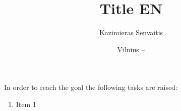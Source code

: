 \documentclass{VUMIFPSbakalaurinis}
\title{Title EN}
\author{Kazimieras Senvaitis}
\date{Vilnius – \the\year}
\begin{document}
\maketitle


\tableofcontents



In order to reach the goal the following tasks are raised:
\begin{enumerate}
	\item Item 1
\end{enumerate}









\printbibliography[heading=bibintoc]




\end{document}
